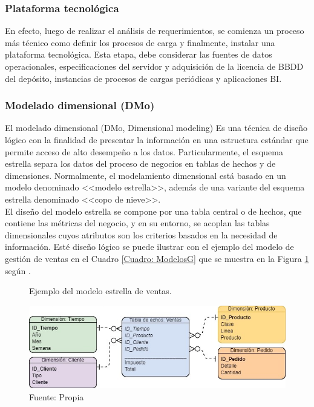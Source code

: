 \documentclass[12pt,jou]{apa7}
\begin{document}
\subsubsection{Plataforma tecnológica}
En efecto, luego de realizar el análisis de requerimientos, se comienza un proceso más técnico como definir los procesos de carga y finalmente, instalar una plataforma tecnológica. Esta etapa, debe considerar las fuentes de datos operacionales, especificaciones del servidor y adquisición de la licencia de BBDD del depósito, instancias de procesos de cargas periódicas y aplicaciones BI.


\subsubsection{Modelado dimensional (DMo)}
El modelado dimensional (DMo, Dimensional modeling) Es una técnica de diseño lógico con la finalidad de presentar la información en una estructura estándar que permite acceso de alto desempeño a los datos. Particularmente, el esquema estrella separa los datos del proceso de negocios en tablas de hechos y de dimensiones. Normalmente, el modelamiento dimensional está basado en un modelo denominado <<modelo estrella>>, además de una variante del esquema estrella denominado <<copo de nieve>>.\\

El diseño del modelo estrella se compone por una tabla central o de hechos, que contiene las métricas del negocio, y en su entorno, se acoplan las tablas dimensionales cuyos atributos son los criterios basados en la necesidad de información. Esté diseño lógico se puede ilustrar con el ejemplo del modelo de gestión de ventas en el Cuadro \ref{Cuadro: ModelosG} que se muestra en la Figura \ref{fig: starModel} según \cite{LaPlata}.

\begin{figure}[h]
\caption{Ejemplo del modelo estrella de ventas.}
\centering
\includegraphics[width=1\linewidth]{Figuras/starModel}
\caption*{ Fuente: Propia}
\label{fig: starModel}
\end{figure}
\end{document}
